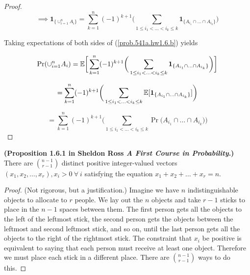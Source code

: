 \begin{theorem}
\begin{proof}
\begin{equation} \label{prob.541a.hw1.6.b}
\implies \boldsymbol{1}_{\{\cup_{i=1}^n A_i\}} = \sum_{k=1}^n (-1)^{k+1} \bigg( \sum_{1 \leq i_1 < \ldots < i_k \leq k} \boldsymbol{1}_{\{A_{i_1} \cap \ldots \cap A_{i_k}\}}\bigg)
\end{equation}

Taking expectations of both sides of (\ref{prob.541a.hw1.6.b}) yields

\[
\Pr(\cup_{i=1}^{n}A_{i}) = \E \bigg[ \sum_{k=1}^n (-1)^{k+1} \bigg( \sum_{1 \leq i_1 < \ldots < i_k \leq k} \boldsymbol{1}_{\{A_{i_1} \cap \ldots \cap A_{i_k}\}}\bigg)\bigg]
\]

\[
= \sum_{k=1}^n (-1)^{k+1} \bigg( \sum_{1 \leq i_1 < \ldots < i_k \leq k} \E [ \boldsymbol{1}_{\{A_{i_1} \cap \ldots \cap A_{i_k}\}} ] \bigg)
\]

\[
= \sum_{k=1}^n (-1)^{k+1} \bigg( \sum_{1 \leq i_1 < \ldots < i_k \leq k} \Pr \big(A_{i_1} \cap \ldots \cap A_{i_k} \big) \bigg)
\]

\end{proof}

\end{theorem}

\begin{proposition} \label{prob.ross1.6.1} \textbf{(Proposition 1.6.1 in Sheldon Ross \textit{A First Course in Probability}.)} There are \(\binom{n-1}{r-1}\) distinct positive integer-valued vectors \((x_1, x_2, \ldots, x_r), x_i > 0 \ \forall \ i\) satisfying the equation \(x_1 + x_2 + \ldots + x_r = n\).

\end{proposition}

\begin{proof} (Not rigorous, but a justification.) Imagine we have \(n\) indistinguishable objects to allocate to \(r\) people. We lay out the \(n\) objects and take \(r - 1\) sticks to place in the \(n - 1\) spaces between them. The first person gets all the objects to the left of the leftmost stick, the second person gets the objects between the leftmost and second leftmost stick, and so on, until the last person gets all the objects to the right of the rightmost stick. The constraint that \(x_i\) be positive is equivalent to saying that each person must receive at least one object. Therefore we must place each stick in a different place. There are \(\binom{n-1}{r-1}\) ways to do this. 

\end{proof}

